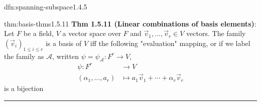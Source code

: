 \documentclass[landscape, 8pt]{extarticle}
\begin{document}
\begin{multicols}{3}
\begin{dfn}{dfn:spanning-subspace}{1.4.5}
\end{dfn}


\begin{thm}{thm:basis-thms}{1.5.11}
    \textbf{Thm 1.5.11 (Linear combinations of basis elements)}: Let $F$ be a field, $V$ a vector space over $F$ and $\vec{v}_{1},\dots,\vec{v}_{r}\in V$ vectors. The family $(\vec{v}_{i})_{1\le i\le r}$ is a basis of $V$ iff the following "evaluation" mapping, or if we label the family as $\mathcal{A}$, written $\psi = \psi_{\mathcal{A}} : F^{r}\to V$,
    \begin{align*}
        \psi : F^{r} &\to V\\
        (\alpha_{1},\dots,a_{r}) &\mapsto a_{1}\vec{v}_{1} + \cdots + \alpha_{r}\vec{v}_{r}
    \end{align*}
    is a bijection

    \vspace{-5pt}
    \noindent\rule{\textwidth}{0.2pt}


\end{thm}
\end{multicols}
\end{document}
